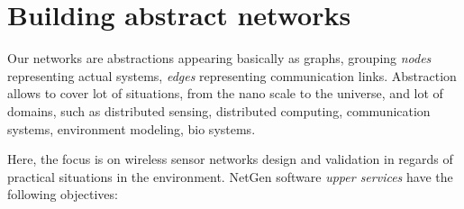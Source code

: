 \documentclass[times]{book}
\begin{document}
\chapter{Building abstract networks}

Our networks are abstractions appearing basically as graphs, grouping {\sl nodes} representing  actual systems, {\sl edges} representing communication links.
Abstraction allows to cover lot of situations, from the nano scale to the universe, and lot of domains, such as distributed sensing, 
distributed computing, communication systems, environment modeling, bio systems.

Here, the focus is on wireless sensor networks design and validation in regards of practical situations in the environment.
NetGen software {\sl upper services} have the following objectives:
\end{document}
